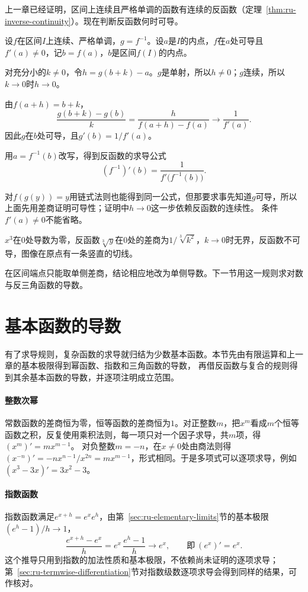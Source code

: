 上一章已经证明，区间上连续且严格单调的函数有连续的反函数（定理~\ref{thm:ru-inverse-continuity}）。现在判断反函数何时可导。

设$f$在区间$I$上连续、严格单调，$g=f^{-1}$。设$a$是$I$的内点，$f$在$a$处可导且$f'(a)\neq0$，记$b=f(a)$，$b$是区间$f(I)$的内点。

对充分小的$k\neq0$，令$h=g(b+k)-a$。$g$是单射，所以$h\neq0$；$g$连续，所以$k\to0$时$h\to0$。

由$f(a+h)=b+k$，
\[
 \frac{g(b+k)-g(b)}k=\frac h{f(a+h)-f(a)}\to\frac1{f'(a)}.
\]
因此$g$在$b$处可导，且$g'(b)=1/f'(a)$。

用$a=f^{-1}(b)$改写，得到反函数的求导公式
\begin{equation}
 (f^{-1})'(b)=\frac1{f'\bigl(f^{-1}(b)\bigr)}.
 \label{eq:ru-inverse-derivative}
\end{equation}

对$f(g(y))=y$用链式法则也能得到同一公式，但那要求事先知道$g$可导，所以上面先用差商证明可导性；证明中$h\to0$这一步依赖反函数的连续性。
条件$f'(a)\neq0$不能省略。
\begin{example}[导数为零处反函数不可导]
\label{ex:ru-cube-root-not-differentiable}
$x^3$在$0$处导数为零，反函数$\sqrt[3]y$在$0$处的差商为$1/\sqrt[3]{k^2}$，$k\to0$时无界，反函数不可导，图像在原点有一条竖直的切线。
\end{example}

在区间端点只能取单侧差商，结论相应地改为单侧导数。下一节用这一规则求对数与反三角函数的导数。
\section{基本函数的导数}
\label{sec:ru-elementary-derivatives}
\label{sec:analysis-elementary-derivatives}

有了求导规则，复杂函数的求导就归结为少数基本函数。本节先由有限运算和上一章的基本极限得到幂函数、指数和三角函数的导数，
再借反函数与复合的规则得到其余基本函数的导数，并逐项注明成立范围。

\paragraph{整数次幂}
常数函数的差商恒为零，恒等函数的差商恒为$1$。对正整数$m$，把$x^m$看成$m$个恒等函数之积，反复使用乘积法则，每一项只对一个因子求导，共$m$项，得$(x^m)'=mx^{m-1}$。
对负整数$m=-n$，在$x\neq0$处由商法则得$(x^{-n})'=-nx^{n-1}/x^{2n}=mx^{m-1}$，形式相同。于是多项式可以逐项求导，例如$(x^3-3x)'=3x^2-3$。

\paragraph{指数函数}
指数函数满足$e^{x+h}=e^xe^h$，由第~\ref{sec:ru-elementary-limits}节的基本极限$(e^h-1)/h\to1$，
\[
 \frac{e^{x+h}-e^x}h=e^x\,\frac{e^h-1}h\to e^x,\qquad\text{即}\ (e^x)'=e^x.
\]
这个推导只用到指数的加法性质和基本极限，不依赖尚未证明的逐项求导；第~\ref{sec:ru-termwise-differentiation}节对指数级数逐项求导会得到同样的结果，可作核对。

